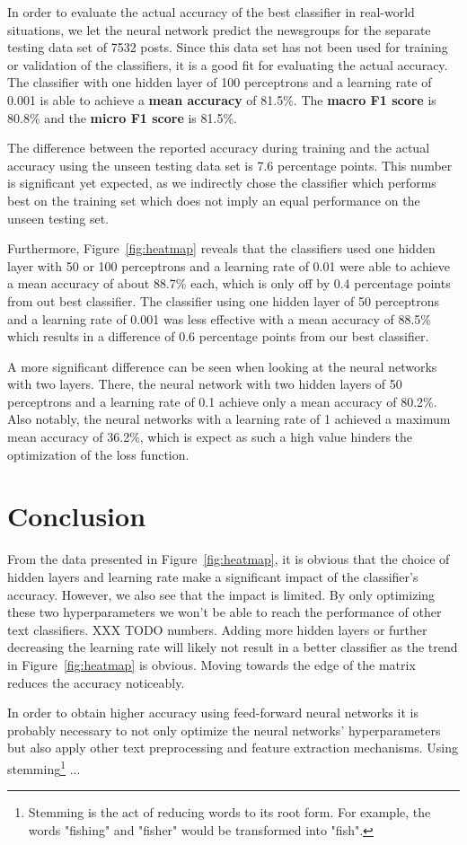 \documentclass[sigconf]{acmart}
\begin{document}
In order to evaluate the actual accuracy of the best classifier in real-world situations, we let the neural network predict the newsgroups for the separate testing data set of 7532 posts. Since this data set has not been used for training or validation of the classifiers, it is a good fit for evaluating the actual accuracy. The classifier with one hidden layer of 100 perceptrons and a learning rate of 0.001 is able to achieve a \textbf{mean accuracy} of 81.5\%. The \textbf{macro F1 score} is 80.8\% and the \textbf{micro F1 score} is 81.5\%.

The difference between the reported accuracy during training and the actual accuracy using the unseen testing data set is 7.6 percentage points. This number is significant yet expected, as we indirectly chose the classifier which performs best on the training set which does not imply an equal performance on the unseen testing set.

Furthermore, Figure~\ref{fig:heatmap} reveals that the classifiers used one hidden layer with 50 or 100 perceptrons and a learning rate of 0.01 were able to achieve a mean accuracy of about 88.7\% each, which is only off by 0.4 percentage points from out best classifier. The classifier using one hidden layer of 50 perceptrons and a learning rate of 0.001 was less effective with a mean accuracy of 88.5\% which results in a difference of 0.6 percentage points from our best classifier.

A more significant difference can be seen when looking at the neural networks with two layers. There, the neural network with two hidden layers of 50 perceptrons and a learning rate of 0.1 achieve only a mean accuracy of 80.2\%.
Also notably, the neural networks with a learning rate of 1 achieved a maximum mean accuracy of 36.2\%, which is expect as such a high value hinders the optimization of the loss function.

\section{Conclusion}

From the data presented in Figure~\ref{fig:heatmap}, it is obvious that the choice of hidden layers and learning rate make a significant impact of the classifier's accuracy. However, we also see that the impact is limited. By only optimizing these two hyperparameters we won't be able to reach the performance of other text classifiers. XXX TODO numbers.
Adding more hidden layers or further decreasing the learning rate will likely not result in a better classifier as the trend in Figure~\ref{fig:heatmap} is obvious. Moving towards the edge of the matrix reduces the accuracy noticeably.

In order to obtain higher accuracy using feed-forward neural networks it is probably necessary to not only optimize the neural networks' hyperparameters but also apply other text preprocessing and feature extraction mechanisms. Using stemming\footnote{Stemming is the act of reducing words to its root form. For example, the words "fishing" and "fisher" would be transformed into "fish".} ... \cite{stemming}



\end{document}
